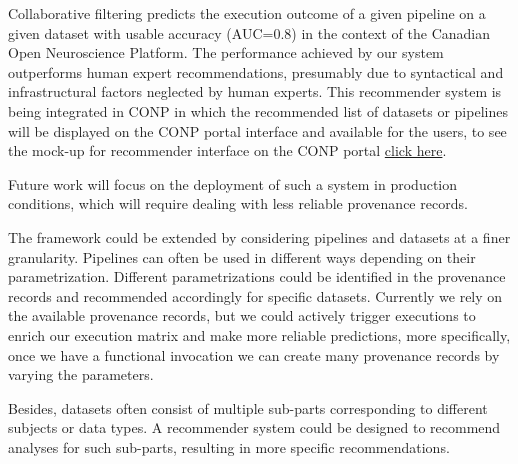 \documentclass[conference]{IEEEtran}
\begin{document}
Collaborative filtering predicts the execution outcome of a given pipeline
on a given dataset with usable accuracy (AUC=0.8) in the context of the
Canadian Open Neuroscience Platform. The performance achieved by our system
outperforms
human expert recommendations, presumably due to syntactical and
infrastructural factors neglected by human experts. This recommender system is being integrated in CONP in which the recommended list of datasets or pipelines will be displayed on the CONP portal interface and available for the users, to see the mock-up for recommender interface on the CONP portal \href{https://github.com/mandana-mazaheri/Pipelines-datasets-recommender-paper/blob/master/result/mockup_for_recommender_on_portal.png}{ click here}. 

Future work will focus on the deployment of such a system in production conditions, which will require dealing with less reliable provenance records.

The framework could be extended by considering pipelines and datasets 
at a finer granularity. Pipelines can often be used in different ways 
depending on their parametrization. Different parametrizations could 
be identified in the provenance records and recommended accordingly 
for specific datasets.
Currently we rely on the available provenance records, but we could actively trigger executions to enrich our execution matrix and make more reliable predictions, more specifically, once we have a functional invocation we can create many provenance records by varying the parameters.


Besides, datasets often consist of multiple 
sub-parts corresponding to different subjects or data types. A recommender 
system could be designed to recommend analyses for such sub-parts, 
resulting in more specific recommendations.






\end{document}
